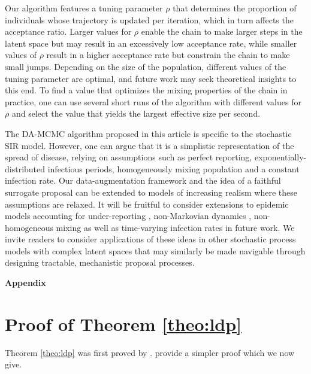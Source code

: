 \documentclass[12pt]{article}
\begin{document}
Our algorithm features a tuning parameter $\rho$ that determines the proportion of individuals whose trajectory is updated per iteration, which in turn affects the acceptance ratio. Larger values for $\rho$ enable the chain to make larger steps in the latent space but may result in an excessively low acceptance rate, while smaller values of $\rho$ result in a higher acceptance rate but constrain the chain to make small jumps. Depending on the size of the population, different values of the tuning parameter are optimal, and future work may seek theoretical insights to this end. To find a value that optimizes the mixing properties of the chain in practice, one can use several short runs of the algorithm with different values for $\rho$ and select the value that yields the largest effective size per second.


The DA-MCMC algorithm proposed in this article is specific to 
the stochastic SIR model. However, one can argue that it is a simplistic representation of the spread of disease, relying on assumptions such as perfect reporting, exponentially-distributed infectious periods, homogeneously mixing population and a constant infection rate. Our data-augmentation framework and the idea of a faithful surrogate proposal can be extended to models of increasing realism where these assumptions are relaxed. It will be fruitful to consider extensions to epidemic models accounting for under-reporting \citep{Fintzi.2017,Morozova.2021}, non-Markovian dynamics \citep{Streftaris.2002}, non-homogeneous mixing \citep{Severo.1969,Lomeli.2021} as well as time-varying infection rates \citep{Kypraios.2018} in future work. We invite readers to consider applications of these ideas in other stochastic process models with complex latent spaces that may similarly be made navigable through designing tractable, mechanistic proposal processes.

\appendix
\begin{center} \Large{\bf Appendix}
\end{center}

\section{Proof of Theorem \ref{theo:ldp}}
\label{app:ldp}

Theorem \ref{theo:ldp} was first proved by \cite{Neuts.1971}. \cite{Ross.1996} provide a simpler proof which we now give.
\end{document}
